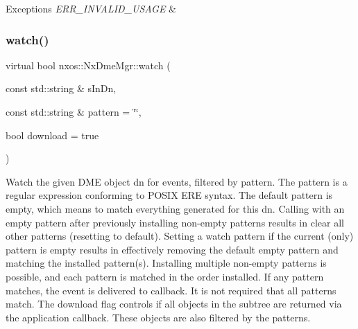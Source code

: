 \begin{DoxyExceptions}{Exceptions}
{\em E\+R\+R\+\_\+\+I\+N\+V\+A\+L\+I\+D\+\_\+\+U\+S\+A\+GE} & \\
\hline
\end{DoxyExceptions}
\mbox{\label{classnxos_1_1_nx_dme_mgr_a84b7abe8172478474ba83a403be390ae}} 
\subsubsection{\texorpdfstring{watch()}{watch()}}
{\footnotesize\ttfamily virtual bool nxos\+::\+Nx\+Dme\+Mgr\+::watch (\begin{DoxyParamCaption}\item[{const std\+::string \&}]{s\+In\+Dn,  }\item[{const std\+::string \&}]{pattern = {\ttfamily \char`\"{}\char`\"{}},  }\item[{bool}]{download = {\ttfamily true} }\end{DoxyParamCaption})\hspace{0.3cm}{\ttfamily [pure virtual]}}

Watch the given D\+ME object dn for events, filtered by pattern. The pattern is a regular expression conforming to P\+O\+S\+IX E\+RE syntax. The default pattern is empty, which means to match everything generated for this dn. Calling with an empty pattern after previously installing non-\/empty patterns results in clear all other patterns (resetting to default). Setting a watch pattern if the current (only) pattern is empty results in effectively removing the default empty pattern and matching the installed pattern(s). Installing multiple non-\/empty patterns is possible, and each pattern is matched in the order installed. If any pattern matches, the event is delivered to callback. It is not required that all patterns match. The \textquotesingle{}download\textquotesingle{} flag controls if all objects in the subtree are returned via the application callback. These objects are also filtered by the patterns.


